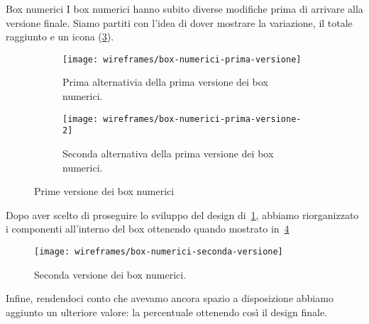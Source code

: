 \begin{bclogo}{Box numerici}
    I box numerici hanno subito diverse modifiche prima di arrivare alla versione finale. Siamo partiti con l'idea di dover mostrare la variazione, il totale raggiunto e un icona (\ref{fig:box-numerici-prima-versione}).
\begin{figure}[H]
\end{figure}

\begin{figure}[H]
    \begin{subfigure}[b]{0.3\textwidth}
        \centering
        \texttt{[image: wireframes/box-numerici-prima-versione]}
        \caption{Prima alternativia della prima versione dei box numerici.}\label{fig:box-numerici-prima-versione1}
    \end{subfigure}
\hfill
    \begin{subfigure}[b]{0.3\textwidth}
        \centering
        \texttt{[image: wireframes/box-numerici-prima-versione-2]}
        \caption{Seconda alternativa della prima versione dei box numerici.}\label{fig:box-numerici-prima-versione2}
    \end{subfigure}
    \caption{Prime versione dei box numerici}\label{fig:box-numerici-prima-versione}
\end{figure}

Dopo aver scelto di proseguire lo sviluppo del design di~\ref{fig:box-numerici-prima-versione1}, abbiamo riorganizzato i componenti all'interno del box ottenendo quando mostrato in~\ref{fig:box-numerici-seconda-versione}

\begin{figure}[H]
    \centering
    \texttt{[image: wireframes/box-numerici-seconda-versione]}
    \caption{Seconda versione dei box numerici.}\label{fig:box-numerici-seconda-versione}
\end{figure}

Infine, rendendoci conto che avevamo ancora spazio a disposizione abbiamo aggiunto un ulteriore valore: la percentuale ottenendo così il design finale.
\end{bclogo}

